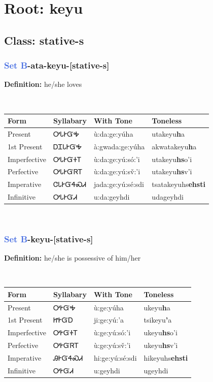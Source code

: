 \needspace{4in}
\section*{Root: keyu}
\nopagebreak
{}
\needspace{3in}
\subsection*{Class: stative-s}
\nopagebreak
\needspace{2in}
\subsubsection*{\textcolor{RoyalBlue}{Set B}{-}ata{-}\textbf{keyu}{-}[stative-s]}
\nopagebreak
\textbf{Definition: } he/she loves
\\[0.5em]
\begin{tabularx}{\textwidth}{l X X X}%
\toprule%
\textbf{Form}&\textbf{Syllabary}&\textbf{With Tone}&\textbf{Toneless}\\%
\midrule%
Present&ᎤᏓᎨᏳᎭ&ù:da:ge:yúha&utakeyu\textbf{h}a\\%
1st Present&ᎠᏆᏓᎨᏳᎭ&à:gwada:ge:yúha&akwatakeyu\textbf{h}a\\%
Imperfective&ᎤᏓᎨᏳᏐᎢ&ù:da:ge:yú:só:’i&utakeyu\textbf{hs}o'i\\%
Perfective&ᎤᏓᎨᏳᏒᎢ&ù:da:ge:yú:sv̌:’i&utakeyu\textbf{hs}v'i\\%
Imperative&ᏣᏓᎨᏳᏎᏍᏗ&jada:ge:yú:sé:sdi&tsatakeyuhs\textbf{ehsti}\\%
Infinitive&ᎤᏓᎨᏳᏗ&u:da:geyhdi&udageyhdi\\%
\bottomrule%
\end{tabularx}
\\[1em]
\needspace{2in}
\subsubsection*{\textcolor{RoyalBlue}{Set B}{-}\textbf{keyu}{-}[stative-s]}
\nopagebreak
\textbf{Definition: } he/she is possessive of him/her
\\[0.5em]
\begin{tabularx}{\textwidth}{l X X X}%
\toprule%
\textbf{Form}&\textbf{Syllabary}&\textbf{With Tone}&\textbf{Toneless}\\%
\midrule%
Present&ᎤᎨᏳᎭ&ù:ge:yúha&ukeyu\textbf{h}a\\%
1st Present&ᏥᎨᏳᎠ&ji:ge:yú:’a&tsikeyu\textbf{'}a\\%
Imperfective&ᎤᎨᏳᏐᎢ&ù:ge:yú:só:’i&ukeyu\textbf{hs}o'i\\%
Perfective&ᎤᎨᏳᏒᎢ&ù:ge:yú:sv̌:’i&ukeyu\textbf{hs}v'i\\%
Imperative&ᎯᎨᏳᏎᏍᏗ&hi:ge:yú:sé:sdi&hikeyuhs\textbf{ehsti}\\%
Infinitive&ᎤᎨᏳᏗ&u:geyhdi&ugeyhdi\\%
\bottomrule%
\end{tabularx}
\\[1em]